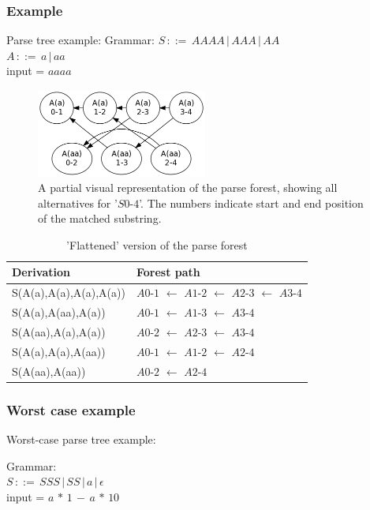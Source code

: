 \documentclass[a4paper,10pt]{article}
\begin{document}
\subsubsection{Example}

Parse tree example:
Grammar:
$S\,::=\,AAAA\,|\,AAA\,|\,AA$\\
$A\,::=\,a\,|\,aa$\\
input = $aaaa$

\begin{figure}[H]
\centering
\includegraphics[width=0.5\textwidth]{a_aa-forest.png}
\caption{A partial visual representation of the parse forest, showing all alternatives for '$S0$-$4$'. The numbers indicate start and end position of the matched substring.}
\end{figure}

\begin{table}[H]
\centering
\begin{tabular}{ p{15em} p{15em} }
Derivation & Forest path\\
\hline
S(A(a),A(a),A(a),A(a)) & $A0$-$1$ $\leftarrow$ $A1$-$2$ $\leftarrow$ $A2$-$3$ $\leftarrow$ $A3$-$4$\\
S(A(a),A(aa),A(a)) & $A0$-$1$ $\leftarrow$ $A1$-$3$ $\leftarrow$ $A3$-$4$\\
S(A(aa),A(a),A(a)) & $A0$-$2$ $\leftarrow$ $A2$-$3$ $\leftarrow$ $A3$-$4$\\
S(A(a),A(a),A(aa)) & $A0$-$1$ $\leftarrow$ $A1$-$2$ $\leftarrow$ $A2$-$4$\\
S(A(aa),A(aa)) & $A0$-$2$ $\leftarrow$ $A2$-$4$
\end{tabular}
\caption{'Flattened' version of the parse forest}
\end{table}

\subsubsection{Worst case example}

Worst-case parse tree example:

Grammar:\\
$S\,::=\,SSS\,|\,SS\,|\,a\,|\,\epsilon$\\
input = $a\,*\,1\,-\,a\,*\,10$
\end{document}
